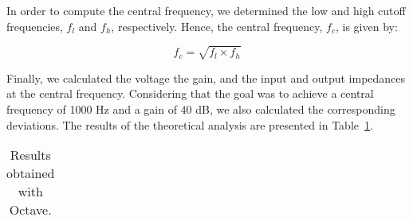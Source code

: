 \vspace{4mm}

In order to compute the central frequency, we determined the low and high cutoff frequencies, $f_l$ and $f_h$, respectively. Hence, the central frequency, $f_c$, is given by:

\begin{equation}
f_c=\sqrt{f_l\times f_h}
\end{equation}

Finally, we calculated the voltage the gain, and the input and output impedances at the central frequency. Considering that the goal was to achieve a central frequency of 1000 Hz and a gain of 40 dB, we also calculated the corresponding deviations. The results of the theoretical analysis are presented in Table~\ref{tab:resultsteo}.

\begin{table}[H]
  \centering
  \begin{tabular}{|l|r|}
    \hline    
  \end{tabular}
  \caption{Results obtained with Octave.}
  \label{tab:resultsteo}
\end{table}

